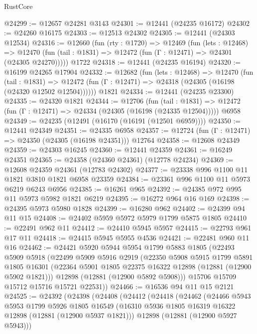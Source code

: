 \begin{lexlean}{RustCore}
\begin{coremodule}
@24299 := @12657 @24281 @3143
@24301 := @12441 (@24235 @16172)
@24302 := @24260 @16175
@24303 := @12513 @24302
@24305 := @12441 (@24303 @12534)
@24316 := @12660
    (fun (rty : @1720) =>
    @12469
      (fun (lets : @12468) =>
      @12470 (fun (tail : @1831) => @12472 (fun (Γ : @12471) => @24301 (@24305 @24270)))))
    @1722
@24318 := @12441 (@24235 @16194)
@24320 := @16199 @24265 @17904
@24332 := @12682
    (fun (lets : @12468) =>
    @12470
      (fun (tail : @1831) =>
      @12472 (fun (Γ : @12471) => @24318 (@24305 (@16198 (@24320 @12502 @12504))))))
    @1821
@24334 := @12441 (@24235 @23300)
@24335 := @24320 @1821
@24344 := @12706
    (fun (tail : @1831) => @12472 (fun (Γ : @12471) => @24334 (@24305 (@16198 (@24335 @12504)))))
    @6958
@24349 := @24235 (@12491 (@16170 (@16191 (@12501 @6959))))
@24350 := @12441 @24349
@24351 := @24335 @6958
@24357 := @12724 (fun (Γ : @12471) => @24350 (@24305 (@16198 @24351))) @12764
@24358 := @12608 @24349
@24359 := @24303 @16245
@24360 := @12441 @24359
@24361 := @16249 @24351
@24365 := @24358 (@24360 @24361) (@12778 @24234)
@24369 := @12608 @24359 @24361 (@12783 @24302)
@24377 := @23338 @996 @1100 @11 @1821 @3810 @1821 @6958 @23359
@24384 := @23361 @996 @1100 @11 @5973 @6219 @6243 @6956
@24385 := @16261 @965
@24392 := @24385 @972 @995 @11 @5973 @5982 @1821 @6219
@24395 := @16272 @964 @16 @169
@24398 := @24395 @5973 @5980 @1828
@24399 := @16280 @962
@24402 := @24399 @94 @11 @15
@24408 := @24402 @5959 @5972 @5979 @1799 @5875 @1805
@24410 := @22491 @962 @11
@24412 := @24410 @5945 @5957
@24415 := @22793 @961 @17 @11
@24418 := @24415 @5945 @5955 @4536
@24421 := @22481 @960 @11 @16
@24462 := @24421
    @5920
    @5944
    @5954
    @1799
    @5883
    @1805
    (@22493
      @5909
      @5918
      (@22499
        @5909
        @5916
        @2919
        (@22350
          @5908
          @5915
          @1799
          @5891
          @1805
          @16301
          (@22364 @5901 @1805 @22375 @16322 @12898 (@12881 (@12900 @5902 @1821)))
          @12898
          (@12881 (@12900 @5892 @5908)))
        @15706
        @15709
        @15712
        @15716
        @15721
        @22531))
@24466 := @16536 @94 @11 @15 @2121
@24525 := @24392
    (@24398
      (@24408
        (@24412
          (@24418
            (@24462
              (@24466
                @5943
                @5953
                @1799
                @5926
                @1805
                @16549
                (@16310 @5936 @1805 @16319 @16322 @12898 (@12881 (@12900 @5937 @1821)))
                @12898
                (@12881 (@12900 @5927 @5943)))

\end{coremodule}
\end{lexlean}
